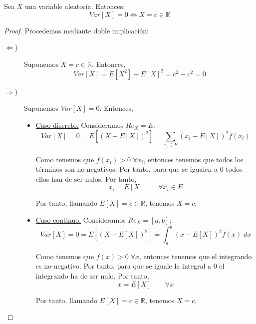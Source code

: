 \begin{prop}\label{prop:6.13}
    Sea $X$ una variable aleatoria. Entonces:
    \begin{equation*}
        Var[X]=0 \Longleftrightarrow X=c\in \mathbb{R}
    \end{equation*}
\end{prop}
\begin{proof}
    Procedemos mediante doble implicación:
    \begin{description}
        \item [$\Longleftarrow$)] Suponemos $X=c\in \mathbb{R}$. Entonces,
        \begin{equation*}
            Var[X] = E[X^2]-E[X]^2 = c^2 -c^2 = 0
        \end{equation*}

        \item [$\Longrightarrow$)] Suponemos $Var[X]=0$. Entonces,
        \begin{itemize}
            \item \underline{Caso discreto.} Consideramos $Re_X = E$:
            \begin{equation*}
                Var[X] = 0 = E[(X-E[X])^2]
                = \sum_{x_i\in E}(x_i-E[X])^2 f(x_i)
            \end{equation*}

            Como tenemos que $f(x_i)> 0\;\forall x_i$, entonces tenemos que todos los términos son no-negativos. Por tanto, para que se igualen a $0$ todos ellos han de ser nulos. Por tanto,
            \begin{equation*}
                x_i = E[X] \qquad \forall x_i \in E
            \end{equation*}

            Por tanto, llamando $E[X]=c\in \mathbb{R}$, tenemos $X=c$.



            \item \underline{Caso continuo.} Consideramos $Re_X = [a,b]$:
            \begin{equation*}
                Var[X] = 0 = E[(X-E[X])^2]
                = \int_a^b (x-E[X])^2 f(x)\;dx
            \end{equation*}

            Como tenemos que $f(x)> 0\;\forall x$, entonces tenemos que el integrando es no-negativo. Por tanto, para que se iguale la integral a $0$ el integrando ha de ser nulo. Por tanto,
            \begin{equation*}
                x = E[X] \qquad \forall x
            \end{equation*}

            Por tanto, llamando $E[X]=c\in \mathbb{R}$, tenemos $X=c$.
        \end{itemize}
    \end{description}
\end{proof}

